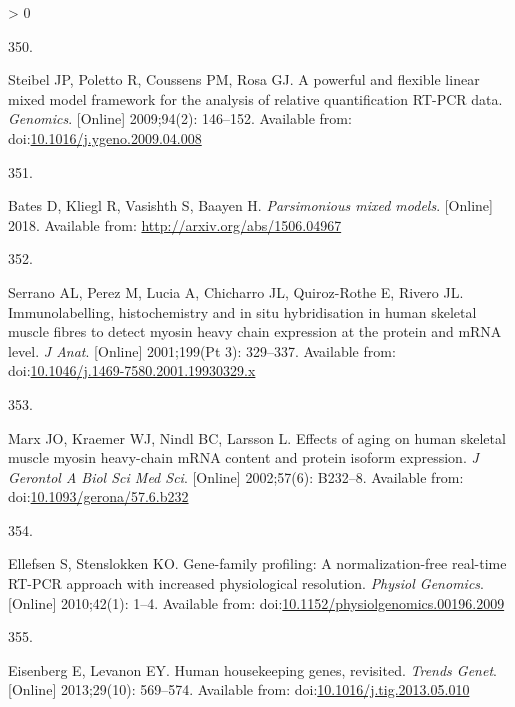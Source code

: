 \documentclass[twoside,10pt]{gihclass} %
\newlength{\cslhangindent}
\newlength{\csllabelwidth}
\newenvironment{CSLReferences}[3] %
 {%
  \setlength{\parindent}{0pt}
  \ifodd #1 \everypar{\setlength{\hangindent}{\cslhangindent}}\ignorespaces\fi
  \ifnum #2 > 0
  \setlength{\parskip}{#2\baselineskip}
  \fi
 }%
 {}
\newcommand{\CSLLeftMargin}[1]{\parbox[t]{\maxof{\widthof{#1}}{\csllabelwidth}}{#1}}
\newcommand{\CSLRightInline}[1]{\parbox[t]{\linewidth}{#1}}
\begin{document}
\begin{CSLReferences}{0}{0}
\leavevmode\hypertarget{ref-RN1154}{}%
\CSLLeftMargin{350. }
\CSLRightInline{Steibel JP, Poletto R, Coussens PM, Rosa GJ. A powerful and flexible linear mixed model framework for the analysis of relative quantification RT-PCR data. \emph{Genomics}. {[}Online{]} 2009;94(2): 146--152. Available from: doi:\href{https://doi.org/10.1016/j.ygeno.2009.04.008}{10.1016/j.ygeno.2009.04.008}}

\leavevmode\hypertarget{ref-bates2018parsimonious}{}%
\CSLLeftMargin{351. }
\CSLRightInline{Bates D, Kliegl R, Vasishth S, Baayen H. \emph{Parsimonious mixed models}. {[}Online{]} 2018. Available from: \url{http://arxiv.org/abs/1506.04967}}

\leavevmode\hypertarget{ref-RN2444}{}%
\CSLLeftMargin{352. }
\CSLRightInline{Serrano AL, Perez M, Lucia A, Chicharro JL, Quiroz-Rothe E, Rivero JL. Immunolabelling, histochemistry and in situ hybridisation in human skeletal muscle fibres to detect myosin heavy chain expression at the protein and mRNA level. \emph{J Anat}. {[}Online{]} 2001;199(Pt 3): 329--337. Available from: doi:\href{https://doi.org/10.1046/j.1469-7580.2001.19930329.x}{10.1046/j.1469-7580.2001.19930329.x}}

\leavevmode\hypertarget{ref-RN2445}{}%
\CSLLeftMargin{353. }
\CSLRightInline{Marx JO, Kraemer WJ, Nindl BC, Larsson L. Effects of aging on human skeletal muscle myosin heavy-chain mRNA content and protein isoform expression. \emph{J Gerontol A Biol Sci Med Sci}. {[}Online{]} 2002;57(6): B232--8. Available from: doi:\href{https://doi.org/10.1093/gerona/57.6.b232}{10.1093/gerona/57.6.b232}}

\leavevmode\hypertarget{ref-RN825}{}%
\CSLLeftMargin{354. }
\CSLRightInline{Ellefsen S, Stenslokken KO. Gene-family profiling: A normalization-free real-time RT-PCR approach with increased physiological resolution. \emph{Physiol Genomics}. {[}Online{]} 2010;42(1): 1--4. Available from: doi:\href{https://doi.org/10.1152/physiolgenomics.00196.2009}{10.1152/physiolgenomics.00196.2009}}

\leavevmode\hypertarget{ref-RN1759}{}%
\CSLLeftMargin{355. }
\CSLRightInline{Eisenberg E, Levanon EY. Human housekeeping genes, revisited. \emph{Trends Genet}. {[}Online{]} 2013;29(10): 569--574. Available from: doi:\href{https://doi.org/10.1016/j.tig.2013.05.010}{10.1016/j.tig.2013.05.010}}

\end{CSLReferences}

\end{document}
